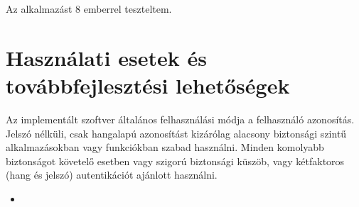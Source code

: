 Az alkalmazást 8 emberrel teszteltem.

\section{Használati esetek és továbbfejlesztési lehetőségek}

Az implementált szoftver általános felhasználási módja a felhasználó azonosítás. Jelszó nélküli, csak hangalapú azonosítást kizárólag alacsony biztonsági szintű alkalmazásokban vagy funkciókban szabad használni. Minden komolyabb biztonságot követelő esetben vagy szigorú biztonsági küszöb, vagy kétfaktoros (hang és jelszó) autentikációt ajánlott használni.
\begin{itemize}
	\item 
\end{itemize}

